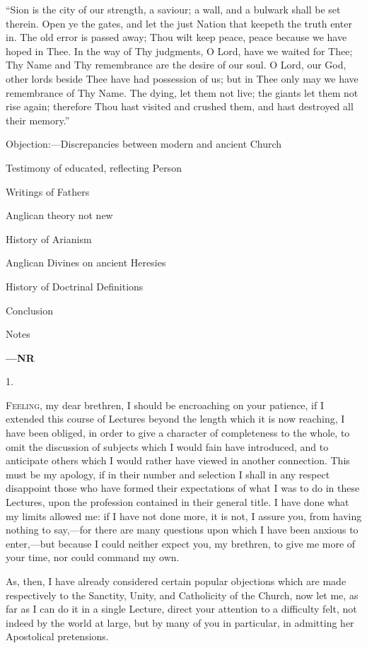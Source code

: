 ``Sion is the city of our strength, a saviour; a wall, and a
bulwark shall be set therein. Open ye the gates, and let the just
Nation that keepeth the truth enter in. The old error is passed away;
Thou wilt keep peace, peace because we have hoped in Thee. In the way
of Thy judgments, O Lord, have we waited for Thee; Thy Name and Thy
remembrance are the desire of our soul. O Lord, our God, other lords
beside Thee have had possession of us; but in Thee only may we have
remembrance of Thy Name. The dying, let them not live; the giants let
them not rise again; therefore Thou hast visited and crushed them, and
hast destroyed all their memory.''


Objection:—Discrepancies between
modern and ancient Church

Testimony of educated, reflecting
Person

Writings of Fathers

Anglican theory not
new

History of Arianism

Anglican Divines on
ancient Heresies

History of Doctrinal
Definitions

Conclusion

Notes

\textbf{—NR}

1.

F\textsc{eeling}, my dear brethren, I should be encroaching on your
patience, if I extended this course of Lectures beyond the length
which it is now reaching, I have been obliged, in order to give a
character of completeness to the whole, to omit the discussion of
subjects which I would fain have introduced, and to anticipate others
which I would rather have viewed in another connection. This must be
my apology, if in their number and selection I shall in any respect
disappoint those who have formed their expectations of what I was to
do in these Lectures, upon the profession contained in their general
title. I have done what my limits allowed me: if I have not done more,
it is not, I assure you, from having nothing to say,—for there are
many questions upon which I have been anxious to enter,—but because
I could neither expect you, my brethren, to give me more of your time,
nor could command my own.

As, then, I have already considered certain popular objections
which are made respectively to the Sanctity, Unity, and Catholicity of
the Church, now let me, as far as I can do it in a single Lecture,
direct your attention to a difficulty felt, not indeed by the world at
large, but by many of you in particular, in admitting her Apostolical
pretensions.

